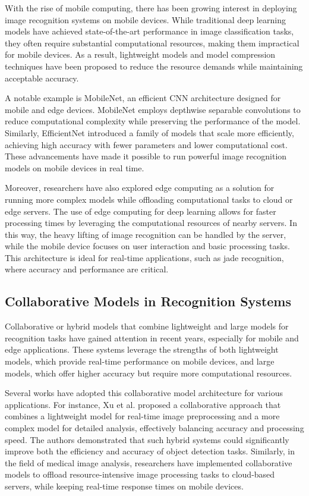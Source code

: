 With the rise of mobile computing, there has been growing interest in deploying image recognition systems on mobile devices. While traditional deep learning models have achieved state-of-the-art performance in image classification tasks, they often require substantial computational resources, making them impractical for mobile devices. As a result, lightweight models and model compression techniques have been proposed to reduce the resource demands while maintaining acceptable accuracy.

A notable example is MobileNet, an efficient CNN architecture designed for mobile and edge devices. MobileNet employs depthwise separable convolutions to reduce computational complexity while preserving the performance of the model. Similarly, EfficientNet introduced a family of models that scale more efficiently, achieving high accuracy with fewer parameters and lower computational cost. These advancements have made it possible to run powerful image recognition models on mobile devices in real time.

Moreover, researchers have also explored edge computing as a solution for running more complex models while offloading computational tasks to cloud or edge servers. The use of edge computing for deep learning allows for faster processing times by leveraging the computational resources of nearby servers. In this way, the heavy lifting of image recognition can be handled by the server, while the mobile device focuses on user interaction and basic processing tasks. This architecture is ideal for real-time applications, such as jade recognition, where accuracy and performance are critical.

\subsection{Collaborative Models in Recognition Systems}

Collaborative or hybrid models that combine lightweight and large models for recognition tasks have gained attention in recent years, especially for mobile and edge applications. These systems leverage the strengths of both lightweight models, which provide real-time performance on mobile devices, and large models, which offer higher accuracy but require more computational resources.

Several works have adopted this collaborative model architecture for various applications. For instance, Xu et al. proposed a collaborative approach that combines a lightweight model for real-time image preprocessing and a more complex model for detailed analysis, effectively balancing accuracy and processing speed. The authors demonstrated that such hybrid systems could significantly improve both the efficiency and accuracy of object detection tasks. Similarly, in the field of medical image analysis, researchers have implemented collaborative models to offload resource-intensive image processing tasks to cloud-based servers, while keeping real-time response times on mobile devices.

